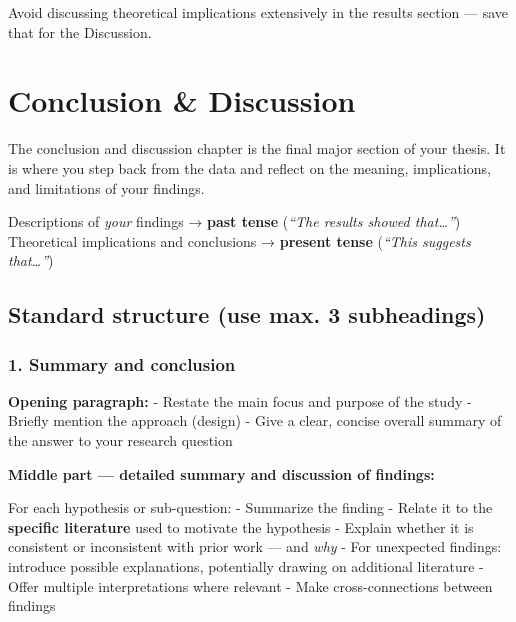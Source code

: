 \documentclass[
  11pt,
  a4paper,
]{scrbook}
\begin{document}
Avoid discussing theoretical implications extensively in the results
section --- save that for the Discussion.

\chapter{Conclusion \& Discussion}\label{conclusion-discussion}

The conclusion and discussion chapter is the final major section of your
thesis. It is where you step back from the data and reflect on the
meaning, implications, and limitations of your findings.

\begin{tcolorbox}[enhanced jigsaw, bottomrule=.15mm, opacityback=0, toprule=.15mm, colframe=quarto-callout-tip-color-frame, left=2mm, rightrule=.15mm, title=\textcolor{quarto-callout-tip-color}{\faLightbulb}\hspace{0.5em}{Language tense}, colbacktitle=quarto-callout-tip-color!10!white, bottomtitle=1mm, colback=white, breakable, toptitle=1mm, titlerule=0mm, leftrule=.75mm, arc=.35mm, opacitybacktitle=0.6, coltitle=black]

Descriptions of \emph{your} findings → \textbf{past tense} (\emph{``The
results showed that\ldots{}''}) Theoretical implications and conclusions
→ \textbf{present tense} (\emph{``This suggests that\ldots{}''})

\end{tcolorbox}

\section{Standard structure (use max. 3
subheadings)}\label{standard-structure-use-max.-3-subheadings}

\subsection{1. Summary and conclusion}\label{summary-and-conclusion}

\textbf{Opening paragraph:} - Restate the main focus and purpose of the
study - Briefly mention the approach (design) - Give a clear, concise
overall summary of the answer to your research question

\textbf{Middle part --- detailed summary and discussion of findings:}

For each hypothesis or sub-question: - Summarize the finding - Relate it
to the \textbf{specific literature} used to motivate the hypothesis -
Explain whether it is consistent or inconsistent with prior work --- and
\emph{why} - For unexpected findings: introduce possible explanations,
potentially drawing on additional literature - Offer multiple
interpretations where relevant - Make cross-connections between findings
\end{document}
